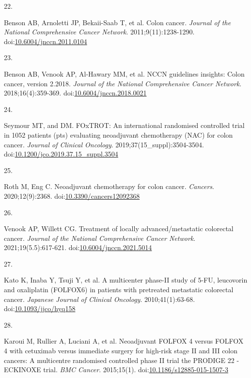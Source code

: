 \documentclass[11pt]{umnthesis}
\newlength{\csllabelwidth}
\newlength{\cslhangindent}
\newenvironment{CSLReferences}[2] %
 {%
  \setlength{\parindent}{0pt}
  \ifodd #1 \everypar{\setlength{\hangindent}{\cslhangindent}}\ignorespaces\fi
  \ifnum #2 > 0
  \setlength{\parskip}{#2\baselineskip}
  \fi
 }%
 {}
\newcommand{\CSLLeftMargin}[1]{\parbox[t]{\csllabelwidth}{#1}}
\newcommand{\CSLRightInline}[1]{\parbox[t]{\linewidth - \csllabelwidth}{#1}}
\begin{document}
\begin{CSLReferences}{0}{0}
\leavevmode{}%
\CSLLeftMargin{22. }
\CSLRightInline{Benson AB, Arnoletti JP, Bekaii-Saab T, et al. Colon cancer. \emph{Journal of the National Comprehensive Cancer Network}. 2011;9(11):1238-1290. doi:\href{https://doi.org/10.6004/jnccn.2011.0104}{10.6004/jnccn.2011.0104}}

\leavevmode{}%
\CSLLeftMargin{23. }
\CSLRightInline{Benson AB, Venook AP, Al-Hawary MM, et al. {NCCN} guidelines insights: Colon cancer, version 2.2018. \emph{Journal of the National Comprehensive Cancer Network}. 2018;16(4):359-369. doi:\href{https://doi.org/10.6004/jnccn.2018.0021}{10.6004/jnccn.2018.0021}}

\leavevmode{}%
\CSLLeftMargin{24. }
\CSLRightInline{Seymour MT, and DM. {FOxTROT}: An international randomised controlled trial in 1052 patients (pts) evaluating neoadjuvant chemotherapy ({NAC}) for colon cancer. \emph{Journal of Clinical Oncology}. 2019;37(15{\_}suppl):3504-3504. doi:\href{https://doi.org/10.1200/jco.2019.37.15_suppl.3504}{10.1200/jco.2019.37.15\_suppl.3504}}

\leavevmode{}%
\CSLLeftMargin{25. }
\CSLRightInline{Roth M, Eng C. Neoadjuvant chemotherapy for colon cancer. \emph{Cancers}. 2020;12(9):2368. doi:\href{https://doi.org/10.3390/cancers12092368}{10.3390/cancers12092368}}

\leavevmode{}%
\CSLLeftMargin{26. }
\CSLRightInline{Venook AP, Willett CG. Treatment of locally advanced/metastatic colorectal cancer. \emph{Journal of the National Comprehensive Cancer Network}. 2021;19(5.5):617-621. doi:\href{https://doi.org/10.6004/jnccn.2021.5014}{10.6004/jnccn.2021.5014}}

\leavevmode{}%
\CSLLeftMargin{27. }
\CSLRightInline{Kato K, Inaba Y, Tsuji Y, et al. A multicenter phase-{II} study of 5-{FU}, leucovorin and oxaliplatin ({FOLFOX}6) in patients with pretreated metastatic colorectal cancer. \emph{Japanese Journal of Clinical Oncology}. 2010;41(1):63-68. doi:\href{https://doi.org/10.1093/jjco/hyq158}{10.1093/jjco/hyq158}}

\leavevmode{}%
\CSLLeftMargin{28. }
\CSLRightInline{Karoui M, Rullier A, Luciani A, et al. Neoadjuvant {FOLFOX} 4 versus {FOLFOX} 4 with cetuximab versus immediate surgery for high-risk stage {II} and {III} colon cancers: A multicentre randomised controlled phase {II} trial {\textendash} the {PRODIGE} 22 - {ECKINOXE} trial. \emph{{BMC} Cancer}. 2015;15(1). doi:\href{https://doi.org/10.1186/s12885-015-1507-3}{10.1186/s12885-015-1507-3}}


\end{CSLReferences}
\end{document}
